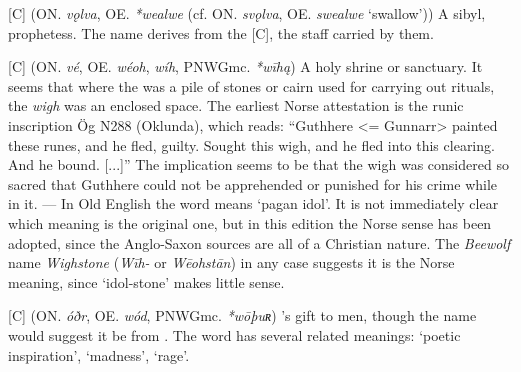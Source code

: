 \begin{itemize}
[C] (ON. \emph{vǫlva}, OE. \emph{*wealwe} (cf. ON. \emph{svǫlva}, OE. \emph{swealwe} ‘swallow’))
  A sibyl, prophetess. The name derives from the [C], the staff carried by them.

[C] (ON. \emph{vé}, OE. \emph{wéoh}, \emph{wíh}, PNWGmc. \emph{*wīhą})
  A holy shrine or sanctuary. It seems that where the  was a pile of stones or cairn used for carrying out rituals, the \emph{wigh} was an enclosed space. The earliest Norse attestation is the runic inscription Ög N288 (Oklunda), which reads: “Guthhere <= Gunnarr> painted these runes, and he fled, guilty. Sought this wigh, and he fled into this clearing. And he bound. [...]” The implication seems to be that the wigh was considered so sacred that Guthhere could not be apprehended or punished for his crime while in it. — In Old English the word means ‘pagan idol’. It is not immediately clear which meaning is the original one, but in this edition the Norse sense has been adopted, since the Anglo-Saxon sources are all of a Christian nature. The \emph{Beewolf} name \emph{Wighstone} (\emph{Wīh-} or \emph{Wēohstān}) in any case suggests it is the Norse meaning, since ‘idol-stone’ makes little sense.

[C] (ON. \emph{óðr}, OE. \emph{wód}, PNWGmc. \emph{*wōþuʀ})
  's gift to men, though the name would suggest it be from . The word has several related meanings: ‘poetic inspiration’, ‘madness’, ‘rage’.

\end{itemize}


